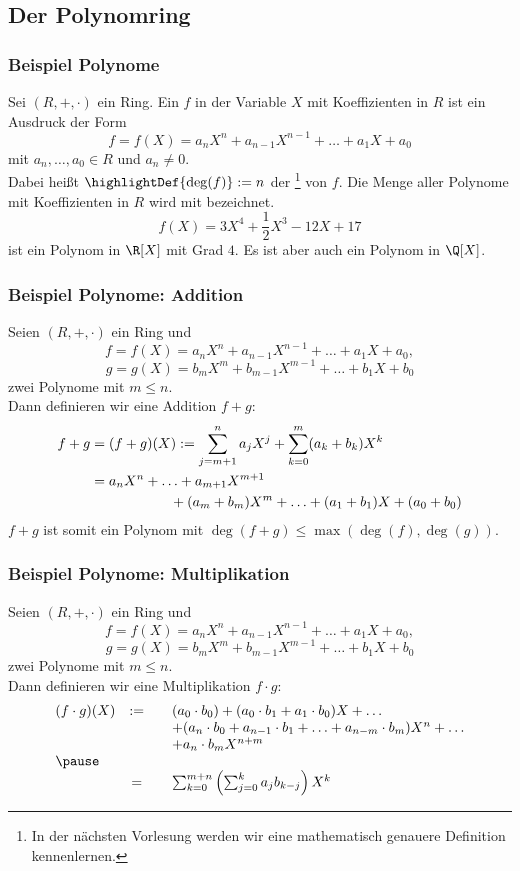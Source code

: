 \subsection{Der Polynomring}
%
\begin{frame}\frametitle{Beispiel Polynome}
	
	Sei $(R,+,\cdot)$ ein Ring. Ein  $f$ in der Variable $X$ mit Koeffizienten in $R$ ist ein Ausdruck der Form
	$$
		f = f(X) = a_nX^n + a_{n-1}X^{n-1} + \ldots + a_1X + a_0 
	$$
	mit $a_n,\ldots, a_0 \in R$ und $a_n\neq 0$. \\\pause
	Dabei hei{\ss}t $\highlightDef{\deg(f)} := n$ der \footnote{In der nächsten Vorlesung werden wir eine mathematisch genauere Definition kennenlernen.} von $f$.
	Die Menge aller Polynome mit Koeffizienten in $R$ wird mit  bezeichnet.
	\pause
	\vfill
	$$
		f(X) = 3X^4 + \frac{1}{2}X^3 - 12X + 17 
	$$
	ist ein Polynom in $\R[X]$ mit Grad $4$. Es ist aber auch ein Polynom in $\Q[X]$. 
	
\end{frame}
%
%
\begin{frame}\frametitle{Beispiel Polynome: Addition}
	
	Seien $(R,+,\cdot)$ ein Ring und  
	$$
		f = f(X) = a_nX^n + a_{n-1}X^{n-1} + \ldots + a_1X + a_0,
	$$
	$$
		g = g(X) = b_mX^m + b_{m-1}X^{m-1} + \ldots + b_1X + b_0
	$$
	zwei Polynome mit $m\leq n$.\\[1mm] 
	Dann definieren wir eine Addition $f+g$:\pause
	\begin{align*}
		f + g &= (f+g)(X) :=\sum_{j=m+1}^n a_j X^j + \sum_{k=0}^m (a_k+b_k)X^k\\
		&= a_nX^n +\ldots + a_{m+1}X^{m+1} \\
		& \hspace{20mm}+ (a_m+b_m) X^m +\ldots+ (a_1+b_1)X +(a_0+b_0)  
	\end{align*} 
	\vfill \pause
	$f+g$ ist somit ein Polynom mit $\deg(f+g) \le \max( \deg(f), \deg(g))$.
\end{frame}
%
%
\begin{frame}\frametitle{Beispiel Polynome: Multiplikation}
	
	Seien $(R,+,\cdot)$ ein Ring und  
	$$
		f = f(X) = a_nX^n + a_{n-1}X^{n-1} + \ldots + a_1X + a_0,
	$$
	$$
		g = g(X) = b_mX^m + b_{m-1}X^{m-1} + \ldots + b_1X + b_0
	$$
	zwei Polynome mit $m\leq n$.\\[1mm]
	Dann definieren wir eine Multiplikation $f \cdot g$: \pause
	$$
		\begin{array}{lccl}
			(f \cdot g)(X) 	&:=	&& 	(a_0 \cdot b_0) + (a_0\cdot b_1+ a_1\cdot b_0)X +\ldots \\
						&	&&+	 (a_n\cdot b_0 + a_{n-1}\cdot b_1 + \ldots + a_{n-m}\cdot b_m)X^n  + \ldots\\
						&	&&+	a_n\cdot b_m X^{n+m}\\ \pause
						&&&\\
						&=&& \sum_{k=0}^{m+n} \left( \sum_{j=0}^k a_j b_{k-j}  \right) X^k
		\end{array}
	$$ 
\end{frame}
